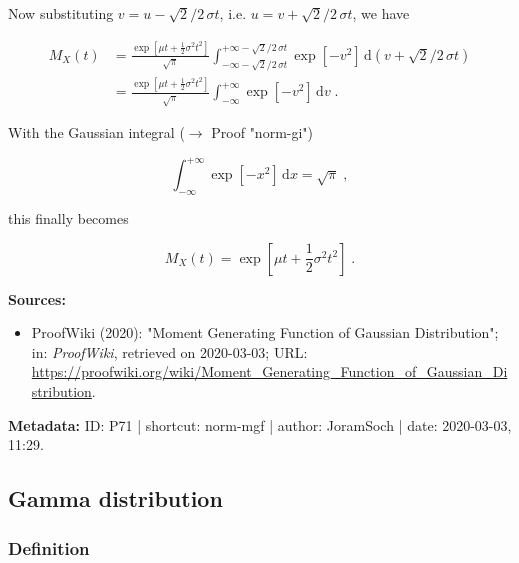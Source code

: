 \documentclass[a4paper,12pt]{book}
\begin{document}
Now substituting $v = u - \sqrt{2}/2 \, \sigma t$, i.e. $u = v + \sqrt{2}/2 \, \sigma t$, we have

\begin{equation} \label{eq:norm-mgf-norm-mgf-s3}
\begin{split}
M_X(t) &= \frac{\exp\left[ \mu t + \frac{1}{2} \sigma^2 t^2 \right]}{\sqrt{\pi}} \int_{-\infty - \sqrt{2}/2 \, \sigma t}^{+\infty - \sqrt{2}/2 \, \sigma t} \exp\left[ -v^2 \right] \, \mathrm{d}\left( v + \sqrt{2}/2 \, \sigma t \right) \\
&= \frac{\exp\left[ \mu t + \frac{1}{2} \sigma^2 t^2 \right]}{\sqrt{\pi}} \int_{-\infty}^{+\infty} \exp\left[ -v^2 \right] \, \mathrm{d}v \; .
\end{split}
\end{equation}

With the Gaussian integral ($\rightarrow$ Proof "norm-gi")

\begin{equation} \label{eq:norm-mgf-gauss}
\int_{-\infty}^{+\infty} \exp\left[ -x^2 \right] \, \mathrm{d}x = \sqrt{\pi} \; ,
\end{equation}

this finally becomes

\begin{equation} \label{eq:norm-mgf-norm-mgf-qed}
M_X(t) = \exp\left[ \mu t + \frac{1}{2} \sigma^2 t^2 \right] \; .
\end{equation}

\vspace{1em}
\textbf{Sources:}
\begin{itemize}
\item ProofWiki (2020): "Moment Generating Function of Gaussian Distribution"; in: \textit{ProofWiki}, retrieved on 2020-03-03; URL: \url{https://proofwiki.org/wiki/Moment_Generating_Function_of_Gaussian_Distribution}.
\end{itemize}


\vspace{1em}
\textbf{Metadata:} ID: P71 | shortcut: norm-mgf | author: JoramSoch | date: 2020-03-03, 11:29.


\subsection{Gamma distribution}

\subsubsection[\textit{Definition}]{Definition} \label{sec:gam}
\end{document}
